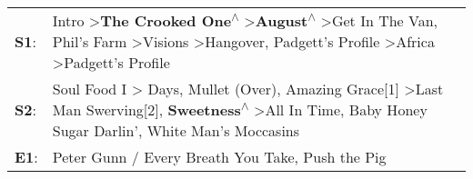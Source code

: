 \begin{supertabular}{p{0.03\textwidth}p{0.92\textwidth}}
 \textbf{S1}:  &  Intro\textsuperscript{} \textgreater \enspace \textbf{The Crooked One\textsuperscript{$\wedge$}} \textgreater \enspace \textbf{August\textsuperscript{$\wedge$}} \textgreater \enspace Get In The Van\textsuperscript{}, \enspace Phil's Farm\textsuperscript{} \textgreater \enspace Visions\textsuperscript{} \textgreater \enspace Hangover\textsuperscript{}, \enspace Padgett's Profile\textsuperscript{} \textgreater \enspace Africa\textsuperscript{} \textgreater \enspace Padgett's Profile\textsuperscript{}  \enspace  \\
 \textbf{S2}:  &                                                                      Soul Food I\textsuperscript{} \textgreater {} Days\textsuperscript{}, \enspace Mullet (Over)\textsuperscript{}, \enspace Amazing Grace[1]\textsuperscript{} \textgreater \enspace Last Man Swerving[2]\textsuperscript{}, \enspace \textbf{Sweetness\textsuperscript{$\wedge$}} \textgreater \enspace All In Time\textsuperscript{}, \enspace Baby Honey Sugar Darlin'\textsuperscript{}, \enspace White Man's Moccasins\textsuperscript{}  \enspace  \\
 \textbf{E1}:  &                                                                                                                                                                                                                                                                                                                                                                                                                            Peter Gunn / Every Breath You Take\textsuperscript{}, \enspace Push the Pig\textsuperscript{}  \enspace  \\
\end{supertabular}
